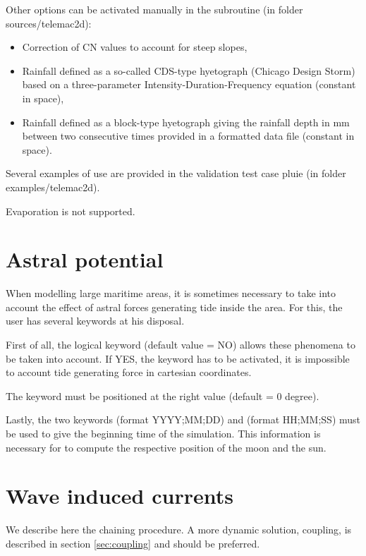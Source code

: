 Other options can be activated manually in the 
subroutine (in folder sources/telemac2d):
\begin{itemize}
\item Correction of CN values to account for steep slopes,
\item Rainfall defined as a so-called CDS-type hyetograph (Chicago Design
Storm) based on a three-parameter Intensity-Duration-Frequency equation
(constant in space),
\item Rainfall defined as a block-type hyetograph giving the rainfall depth
in mm between two consecutive times provided in a formatted data file (constant
in space).
\end{itemize}
Several examples of use are provided in the validation test case pluie
(in folder examples/telemac2d).

Evaporation is not supported.


\section{Astral potential}
\label{sec:astral:pot}
When modelling large maritime areas, it is sometimes necessary to take into
account the effect of astral forces generating tide inside the area.
For this, the user has several keywords at his disposal.

First of all, the logical keyword 
(default value = NO) allows these phenomena to be taken into account.
If YES, the keyword  has to be activated,
it is impossible to account tide generating force in cartesian coordinates.

The keyword  must be positioned at the right
value (default = 0 degree).

Lastly, the two keywords  (format YYYY;MM;DD)
and  (format HH;MM;SS) must be used
to give the beginning time of the simulation.
This information is necessary for  to compute the respective
position of the moon and the sun.


\section{Wave induced currents}

We describe here the chaining procedure.
A more dynamic solution, coupling, is described in section \ref{sec:coupling}
and should be preferred.

